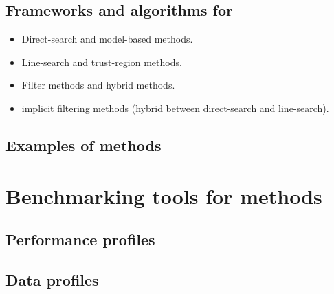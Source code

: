 \subsection{Frameworks and algorithms for }

\begin{itemize}
    \item Direct-search and model-based methods.
    \item Line-search and trust-region methods.
    \item Filter methods and hybrid methods.
    \item implicit filtering methods (hybrid between direct-search and line-search).
\end{itemize}

\subsection{Examples of  methods}

\section{Benchmarking tools for  methods}

\subsection{Performance profiles}

\subsection{Data profiles}
